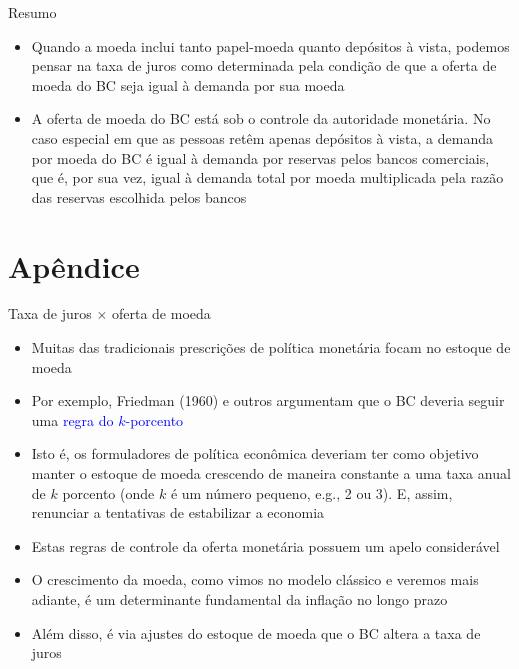 \documentclass[10pt]{beamer}
\begin{document}
\begin{frame}{Resumo}
    \begin{itemize}
        \item Quando a moeda inclui tanto papel-moeda quanto depósitos à vista, podemos pensar na taxa de juros como determinada pela condição de que a oferta de moeda do BC seja igual à demanda por sua moeda
        \bigskip
        \item A oferta de moeda do BC está sob o controle da autoridade monetária. No caso especial em que as pessoas retêm apenas depósitos à vista, a demanda por moeda do BC é igual à demanda por reservas pelos bancos comerciais, que é, por sua vez, igual à demanda total por moeda multiplicada pela razão das reservas escolhida pelos bancos
    \end{itemize}
\end{frame}

\section{Apêndice}
\begin{frame}{Taxa de juros $\times$ oferta de moeda}\label{apendice}
    \begin{itemize}
        \item Muitas das tradicionais prescrições de política monetária focam no estoque de moeda
        \bigskip
        \item Por exemplo, Friedman (1960) e outros argumentam que o BC deveria seguir uma \textcolor{blue}{regra do $k$-porcento}
        \bigskip
        \item Isto é, os formuladores de política econômica deveriam ter como objetivo manter o estoque de moeda crescendo de maneira constante a uma taxa anual de $k$ porcento (onde $k$ é um número pequeno, e.g., 2 ou 3). E, assim, renunciar a tentativas de estabilizar a economia
        \bigskip
        \item Estas regras de controle da oferta monetária possuem um apelo considerável
        \bigskip
        \item O crescimento da moeda, como vimos no modelo clássico e veremos mais adiante, é um determinante fundamental da inflação no longo prazo
        \bigskip
        \item Além disso, é via ajustes do estoque de moeda que o BC altera a taxa de juros
    \end{itemize}
\end{frame}
\end{document}
